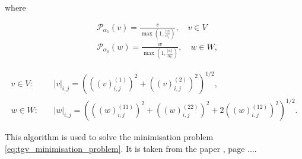 \documentclass{article}
\begin{document}
where 

\begin{equation}
    \begin{aligned}
    & \mathcal{P}_{\alpha_1}(v) = \frac{v}{\max \left(1, \frac{|v|}{\alpha_1}\right)}, \quad v \in V \\
    & \mathcal{P}_{\alpha_0}(w) = \frac{w}{\max \left(1, \frac{|w|}{\alpha_0}\right)}, \quad w \in W,
    \end{aligned}
\end{equation}



\begin{equation}
    \begin{aligned}
    v \in V : \quad &|v|_{i,j} = \left( \left( (v)_{i,j}^{(1)} \right)^{2} + \left( (v)_{i,j}^{(2)} \right)^{2} \right)^{1/2}, \\
    w \in W : \quad &|w|_{i,j} = \left( \left( (w)_{i,j}^{(11)} \right)^{2} + \left( (w)_{i,j}^{(22)} \right)^{2} + 2 \left( (w)_{i,j}^{(12)} \right)^{2} \right)^{1/2}.
    \end{aligned}
\end{equation}


This algorithm is used to solve the minimisation problem \ref{eq:tgv_minimisation_problem}.
It is taken from the paper \cite{recovering_piecewise_smooth_multichannel_images}, page ....



\printbibliography
\end{document}
